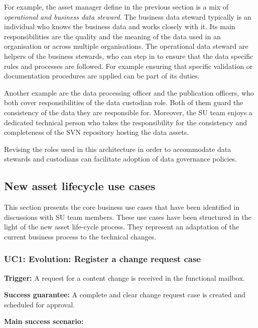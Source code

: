      For example, the asset manager define in the previous section is a mix of \textit{operational and business data steward}. The business data steward typically is an individual who knows the business data and works closely with it. Its main responsibilities are the quality and the meaning of the data used in an organisation or across multiple organisations. The operational data steward are helpers of the business stewards, who can step in to ensure that the data specific rules and processes are followed. For example ensuring that specific validation or documentation procedures are applied can be part of its duties. 
     
     Another example are the data processing officer and the publication officers, who both cover responsibilities of the data custodian role. Both of them guard the consistency of the data they are responsible for. Moreover, the SU team enjoys a dedicated technical person who takes the responsibility for the consistency and completeness of the SVN repository hosting the data assets.

    Revising the roles used in this architecture in order to accommodate data stewards and custodians can facilitate adoption of data governance policies.  

    \subsection{New asset lifecycle use cases}
    \label{sec:business-use cases}
	
	This section presents the core business use cases that have been identified in discussions with SU team members. These use cases have been structured in the light of the new asset life-cycle process. They represent an adaptation of the current business process to the technical changes. 
	
	\subsubsection{UC1: Evolution: Register a change request case}
	\label{sec:uc1}
	
	\textbf{Trigger:} A request for a content change is received in the functional mailbox.
	
	\textbf{Success guarantee:} A complete and clear change request case is created and scheduled for approval.
	
	\textbf{Main success scenario:}
	
